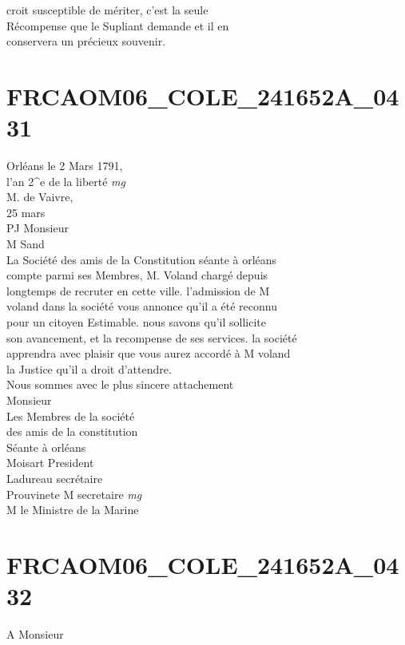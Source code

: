 \documentclass{article}
\begin{document}
\begin{pages}
croit susceptible de mériter, c'est la seule\\
Récompense que le Supliant demande et il en\\
conservera un précieux souvenir.
\pend
\endnumbering\beginnumbering\section{FRCAOM06\_COLE\_241652A\_0431}\pstart
Orléans le 2 Mars 1791,\\
l'an 2\^{}e de la liberté
\pend
\vspace{0.5cm}\noindent
\textit{mg}
\footnotesize \\
M. de Vaivre,\\
25 mars\\
PJ
\normalsize \pstart
Monsieur\\
M Sand\\
La Société des amis de la Constitution séante à orléans\\
compte parmi ses Membres, M. Voland chargé depuis\\
longtemps de recruter en cette ville. l'admission de M\\
voland dans la société vous annonce qu'il a été reconnu\\
pour un citoyen Estimable. nous savons qu'il sollicite\\
son avancement, et la recompense de ses services. la société\\
apprendra avec plaisir que vous aurez accordé à M voland\\
la Justice qu'il a droit d'attendre.\\
Nous sommes avec le plus sincere attachement\\
Monsieur\\
Les Membres de la société\\
des amis de la constitution\\
Séante à orléans\\
Moisart President\\
Ladureau secrétaire\\
Prouvinete M secretaire
\pend
\vspace{0.5cm}\noindent
\textit{mg}
\footnotesize \\
M le Ministre de la Marine
\normalsize 
\endnumbering\beginnumbering\section{FRCAOM06\_COLE\_241652A\_0432}\pstart
A Monsieur\\

\end{pages}
\end{document}
